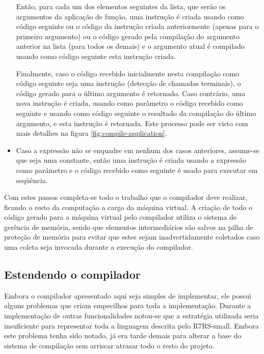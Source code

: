 \begin{itemize}
Então, para cada um dos elementos seguintes da lista, que serão os argumentos
da aplicação de função, uma instrução   é criada usando como
código seguinte ou o código da instrução  criada anteriormente 
(apenas para o primeiro argumento) ou o código gerado pela compilação do
argumento anterior na lista (para todos os demais) e o argumento atual é
compilado usando como código seguinte esta instrução  criada.

Finalmente, caso o código recebido inicialmente nesta compilação como código
seguinte seja uma instrução  (detecção de chamadas terminais),
o código gerado para o último argumento é retornado. Caso contrário, uma nova
instrução  é criada, usando como parâmetro o código recebido como
seguinte e usando como código seguinte o resultado da compilação do último 
argumento, e esta instrução  é retornada. Este processo pode ser
visto com mais detalhes na figura \ref{fig:compile-application}.

\item Caso a expressão não se enquadre em nenhum dos casos anteriores, 
assume-se que seja uma constante, então uma instrução  é criada
usando a expressão como parâmetro e o código recebido como seguinte é usado 
para executar em seqüência.

\end{itemize}

Com estes passos completa-se todo o trabalho que o compilador deve realizar,
ficando o resto da computação a cargo da máquina virtual. A criação de todo o
código gerado para a máquina virtual pelo compilador utiliza o sistema de 
gerência de memória, sendo que elementos intermediários são salvos na pilha de 
proteção de memória para evitar que estes sejam inadvertidamente coletados caso
uma coleta seja invocada durante a execução do compilador. 

\subsection{Estendendo o compilador}
\label{ss:solucoes-compilador}

Embora o compilador apresentado aqui seja simples de implementar,
ele possui alguns problemas que criam empecilhos para toda a implementação.
Durante a implementação de outras funcionalidades notou-se que a estratégia
utilizada seria insuficiente para representar toda a linguagem descrita pelo
\acs{R7RS}-small. Embora este problema tenha sido notado, já era tarde demais
para alterar a base do sistema de compilação sem arriscar atrasar todo o resto
do projeto.

